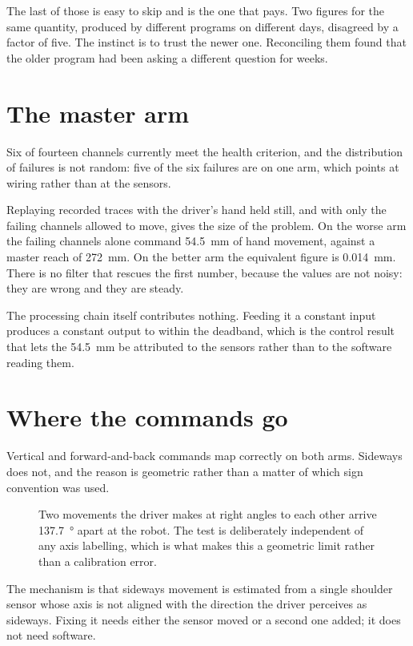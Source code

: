 The last of those is easy to skip and is the one that pays. Two figures for
the same quantity, produced by different programs on different days, disagreed
by a factor of five. The instinct is to trust the newer one. Reconciling them
found that the older program had been asking a different question for weeks.

\section{The master arm}

Six of fourteen channels currently meet the health criterion, and the
distribution of failures is not random: five of the six failures are on one
arm, which points at wiring rather than at the sensors.

Replaying recorded traces with the driver's hand held still, and with only the
failing channels allowed to move, gives the size of the problem. On the worse
arm the failing channels alone command \SI{54.5}{\milli\metre} of hand
movement, against a master reach of \SI{272}{\milli\metre}. On the better arm
the equivalent figure is \SI{0.014}{\milli\metre}. There is no filter that
rescues the first number, because the values are not noisy: they are wrong and
they are steady.

The processing chain itself contributes nothing. Feeding it a constant input
produces a constant output to within the deadband, which is the control
result that lets the \SI{54.5}{\milli\metre} be attributed to the sensors
rather than to the software reading them.

\section{Where the commands go}

Vertical and forward-and-back commands map correctly on both arms. Sideways
does not, and the reason is geometric rather than a matter of which sign
convention was used.

\begin{figure}[htbp]
  \centering
  
  \caption[The sideways problem]{Two movements the driver makes at right
  angles to each other arrive \SI{137.7}{\degree} apart at the robot. The test
  is deliberately independent of any axis labelling, which is what makes this
  a geometric limit rather than a calibration error.}
  \label{fig:lateral}
\end{figure}

The mechanism is that sideways movement is estimated from a single shoulder
sensor whose axis is not aligned with the direction the driver perceives as
sideways. Fixing it needs either the sensor moved or a second one added; it
does not need software.

